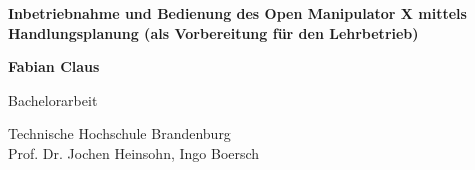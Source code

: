 \begin{titlepage}
    \begin{center}
        \vspace*{1cm}
            
        \Huge
        \textbf{Inbetriebnahme und Bedienung des Open Manipulator X mittels Handlungsplanung (als Vorbereitung für den Lehrbetrieb)}
            
        \vspace{0.5cm}
        \LARGE
        
            
        \vspace{1.5cm}
            
        \textbf{Fabian Claus}\\
            
        \vfill
            
       Bachelorarbeit
            
        \vspace{0.8cm}
            
            
        \Large
        Technische Hochschule Brandenburg\\
        Prof. Dr. Jochen Heinsohn, Ingo Boersch\\
            
    \end{center}
\end{titlepage}